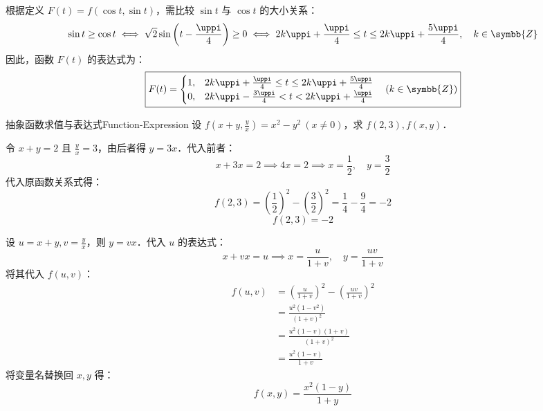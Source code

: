 \begin{solution}
    根据定义 $F(t) = f(\cos t, \sin t)$，需比较 $\sin t$ 与 $\cos t$ 的大小关系：
    \begin{equation}
        \sin t \ge \cos t \iff \sqrt{2}\sin\left( t - \frac{\uppi}{4} \right) \ge 0 \iff 2k\uppi + \frac{\uppi}{4} \le t \le 2k\uppi + \frac{5\uppi}{4}, \quad k \in \symbb{Z}
    \end{equation}
    因此，函数 $F(t)$ 的表达式为：
    \begin{equation}
        \boxed{F(t) = \begin{cases} 1, & 2k\uppi + \frac{\uppi}{4} \le t \le 2k\uppi + \frac{5\uppi}{4} \\ 0, & 2k\uppi - \frac{3\uppi}{4} < t < 2k\uppi + \frac{\uppi}{4} \end{cases} \quad (k \in \symbb{Z})}
    \end{equation}
\end{solution}

\begin{problem}{抽象函数求值与表达式}{Function-Expression}
    设 $f(x + y, \frac{y}{x}) = x^2 - y^2 \ (x \neq 0)$，求 $f(2, 3), f(x, y)$．
\end{problem}

\begin{solution}
    令 $x + y = 2$ 且 $\frac{y}{x} = 3$，由后者得 $y = 3x$．代入前者：
    \begin{equation}
        x + 3x = 2 \implies 4x = 2 \implies x = \frac{1}{2}, \quad y = \frac{3}{2}
    \end{equation}
    代入原函数关系式得：
    \begin{equation}
        f(2, 3) = \left( \frac{1}{2} \right)^2 - \left( \frac{3}{2} \right)^2 = \frac{1}{4} - \frac{9}{4} = -2
    \end{equation}
    \begin{equation}
        \boxed{f(2, 3) = -2}
    \end{equation}

    设 $u = x + y, v = \frac{y}{x}$，则 $y = vx$．代入 $u$ 的表达式：
    \begin{equation}
        x + vx = u \implies x = \frac{u}{1+v}, \quad y = \frac{uv}{1+v}
    \end{equation}
    将其代入 $f(u, v)$：
    \begin{equation}
        \begin{aligned}
            f(u, v) & = \left( \frac{u}{1+v} \right)^2 - \left( \frac{uv}{1+v} \right)^2 \\
                    & = \frac{u^2(1 - v^2)}{(1+v)^2}                                     \\
                    & = \frac{u^2(1-v)(1+v)}{(1+v)^2}                                    \\
                    & = \frac{u^2(1-v)}{1+v}
        \end{aligned}
    \end{equation}
    将变量名替换回 $x, y$ 得：
    \begin{equation}
        \boxed{f(x, y) = \frac{x^2(1-y)}{1+y}}
    \end{equation}
\end{solution}

